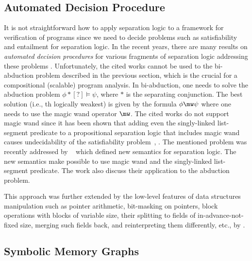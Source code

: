 	  \subsection{Automated Decision Procedure}
          It is not straightforward how to apply separation logic to a framework for verification of programs
          since we need to decide problems such as satisfiability and entailment for separation logic.
          In the recent years, there are many results on \emph{automated decision
          procedures} for various fragments of separation logic addressing these problems
          \cite{enea_compositional_2014, iosif_deciding_2014,
          soa-JensFlorian:BeyondSymHeap:20, soa-LocLe:VMCAI21, soa-Radu:CADE21}.
          Unfortunately, the cited works cannot be used to the bi-abduction problem described in
          the previous section, which is the crucial for a compositional (scalable) program analysis.
          In bi-abduction, one needs to solve the abduction problem $\phi * [?] \models \psi$,
          where $*$ is the separating conjunction.
          The best solution (i.e., th logically weakest) is given by the formula $\phi \mw \psi$
          where one needs to use the magic wand operator $\mw$.
          The cited works do not support magic wand since it has been shown
          that adding even the singly-linked list-segment predicate to a propositional separation
          logic that includes magic wand causes undecidability of the satisfiability
          problem~\cite{soa-conf/fossacs/DemriLM18}, \cite{soa-books/daglib/0034962}.
          The mentioned problem was recently addressed by ~\cite{soa-conf/esop/PagelZ21}
          which defined new semantics for separation logic.
          The new semantics make possible to use magic wand and the singly-linked list-segment
          predicate.
          The work also discuss their application to the abduction problem.

          This approach was further extended by the low-level features of data structures
          manipulation such as pointer arithmetic, bit-masking on pointers,
          block operations with blocks of variable size, their splitting to fields of in-advance-not-fixed size,
          merging such fields back, and reinterpreting them differently, etc., by \cite{soa-biabduction}. 

	  \subsection{Symbolic Memory Graphs}


